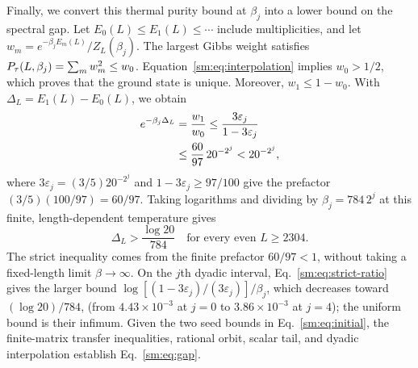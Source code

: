 Finally, we convert this thermal purity bound at $\beta_j$ into a lower
bound on the spectral gap. Let $E_0(L)\le E_1(L)\le\cdots$ include
multiplicities, and let $w_m=e^{-\beta_j E_m(L)}/Z_L(\beta_j)$.
The largest Gibbs weight satisfies
$P_{\tau}(L,\beta_j)=\sum_m w_m^2\le w_0$.
Equation~\eqref{sm:eq:interpolation} implies $w_0>1/2$, which
proves that the ground state is unique.
Moreover, $w_1\le1-w_0$. With
$\Delta_L=E_1(L)-E_0(L)$, we obtain
\begin{align}
 e^{-\beta_j\Delta_L}
 &=\frac{w_1}{w_0}
 \le\frac{3\varepsilon_j}{1-3\varepsilon_j} \notag\\
 &\le\frac{60}{97}\,20^{-2^j}
 <20^{-2^j},
 \label{sm:eq:strict-ratio}
\end{align}
where $3\varepsilon_j=(3/5)20^{-2^j}$ and
$1-3\varepsilon_j\ge97/100$ give the prefactor $(3/5)(100/97)=60/97$.
Taking logarithms and dividing by $\beta_j=784\,2^j$ at this finite,
length-dependent temperature gives
\begin{equation}
 \boxed{
 \Delta_L>\frac{\log20}{784}
 \quad\text{for every even }L\ge2304
 }.
 \label{sm:eq:gap}
\end{equation}
The strict inequality comes from the finite prefactor $60/97<1$,
without taking a fixed-length limit $\beta\to\infty$. On the $j$th dyadic
interval, Eq.~\eqref{sm:eq:strict-ratio} gives the larger bound
$\log[(1-3\varepsilon_j)/(3\varepsilon_j)]/\beta_j$, which decreases
toward $(\log20)/784$,
(from $4.43\times10^{-3}$ at $j=0$ to $3.86\times10^{-3}$ at $j=4$); the
uniform bound is their infimum.
Given the two seed bounds in Eq.~\eqref{sm:eq:initial}, the finite-matrix
transfer inequalities, rational orbit, scalar tail, and dyadic
interpolation establish Eq.~\eqref{sm:eq:gap}.
